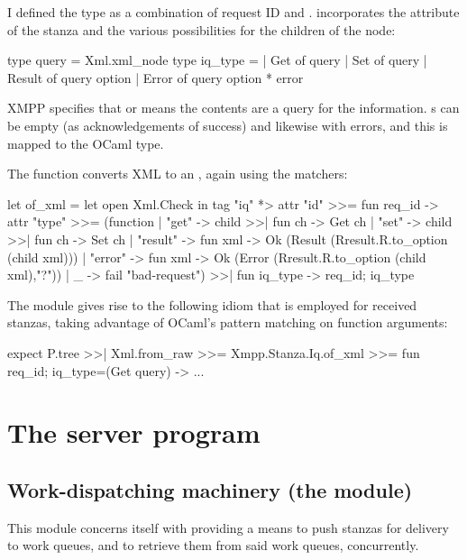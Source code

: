 \documentclass[12pt,a4paper,twoside,openright]{report}
\begin{document}
{I defined the type  as a combination of request ID and .  incorporates the  attribute of the  stanza and the various possibilities for the children of the node:

\begin{ocaml}
  type query = Xml.xml_node
  type iq_type =
  | Get of query
  | Set of query
  | Result of query option
  | Error of query option * error
\end{ocaml}

XMPP specifies that  or  means the contents are a query for the information.  s can be empty (as acknowledgements of success) and likewise with errors, and this is mapped to the OCaml  type.

The  function converts XML to an , again using the matchers:

\begin{ocaml}
let of_xml =
let open Xml.Check in
  tag "iq" *> attr "id" >>= fun req_id ->
    attr "type" >>= (function
    | "get" -> child >>| fun ch -> Get ch
    | "set" -> child >>| fun ch -> Set ch
    | "result" -> fun xml -> Ok (Result (Rresult.R.to_option (child xml)))
    | "error" -> fun xml -> Ok (Error (Rresult.R.to_option (child xml),"?"))
    | _ -> fail "bad-request") >>| fun iq_type -> { req_id; iq_type }
\end{ocaml}

The module gives rise to the following idiom that is employed for received  stanzas, taking advantage of OCaml's pattern matching on function arguments:

\begin{ocaml}
  expect P.tree >>| Xml.from_raw >>= Xmpp.Stanza.Iq.of_xml >>=
  fun { req_id; iq_type=(Get query) } -> ...
\end{ocaml}

\section{The server program}
\subsection{Work-dispatching machinery (the  module)}\label{sec:mod-dispatch}
This module concerns itself with providing a means to push stanzas for delivery to work queues, and to retrieve them from said work queues, concurrently.

}
\end{document}
